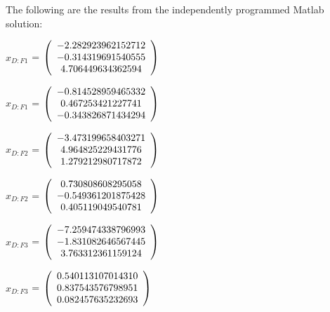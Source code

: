 \begin{description}
The following are the results from the independently programmed Matlab solution:

$x_{D:F1}$  = $\left( \begin{array} {ccc} -2.282923962152712 \\ -0.314319691540555 \\ 4.706449634362594
\end{array} \right)\\ \\$

$\hat{x}_{D:F1}$  = $\left( \begin{array} {ccc} -0.814528959465332 \\ 0.467253421227741 \\ -0.343826871434294
\end{array} \right)\\ \\$

$x_{D:F2}$  = $\left( \begin{array} {ccc} -3.473199658403271 \\ 4.964825229431776 \\ 1.279212980717872
\end{array} \right)\\ \\$

$\hat{x}_{D:F2}$  = $\left( \begin{array} {ccc} 0.730808608295058 \\ -0.549361201875428 \\ 0.405119049540781
\end{array} \right)\\ \\$

$x_{D:F3}$  = $\left( \begin{array} {ccc} -7.259474338796993 \\ -1.831082646567445 \\ 3.763312361159124
\end{array} \right)\\ \\$

$\hat{x}_{D:F3}$  = $\left( \begin{array} {ccc} 0.540113107014310 \\ 0.837543576798951 \\ 0.082457635232693
\end{array} \right)\\ \\$


\end{description}
